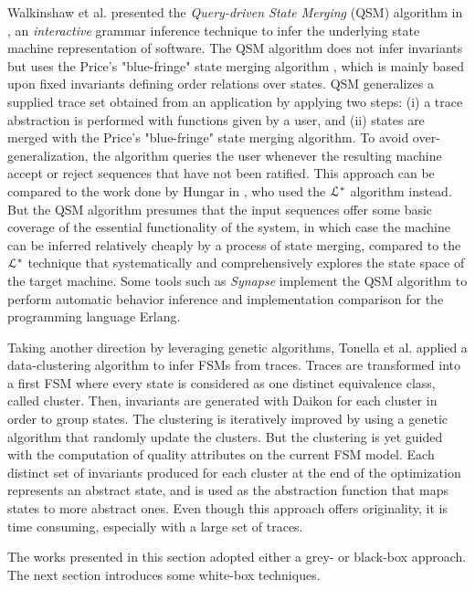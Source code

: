 Walkinshaw et al. presented the \textit{Query-driven State
Merging} (QSM) algorithm in
\cite{Walkinshaw07reverseengineering}, an \textit{interactive}
grammar inference technique to infer the underlying state machine
representation of software. The QSM algorithm does not infer
invariants but uses the Price's "blue-fringe" state merging
algorithm \cite{Lang:1998:RAO:645517.655780}, which is mainly
based upon fixed invariants defining order relations over states.
QSM generalizes a supplied trace set obtained from an application
by applying two steps: (i) a trace abstraction is performed
with functions given by a user, and (ii) states are merged with
the Price's "blue-fringe" state merging algorithm. To avoid
over-generalization, the algorithm queries the user whenever the
resulting machine accept or reject sequences that have not
been ratified. This approach can be compared to the work done by
Hungar in \cite{hungar}, who used the $\EuScript{L}^*$ algorithm
instead. But the QSM algorithm presumes that the input sequences
offer some basic coverage of the essential functionality of the
system, in which case the machine can be inferred relatively
cheaply by a process of state merging, compared to the
$\EuScript{L}^*$ technique that systematically and
comprehensively explores the state space of the target machine.
Some tools such as \textit{Synapse}
\cite{LamelaSeijas:2014:SAB:2633448.2633457} implement the QSM
algorithm to perform automatic behavior inference and
implementation comparison for the programming language Erlang.

Taking another direction by leveraging genetic algorithms,
Tonella et al. \cite{TonellaNMLH13} applied a data-clustering
algorithm to infer FSMs from traces. Traces are transformed into a
first FSM where every state is considered as one distinct
equivalence class, called cluster. Then, invariants are generated
with Daikon for each cluster in order to group states. The
clustering is iteratively improved by using a genetic algorithm
that randomly update the clusters. But the clustering is yet
guided with the computation of quality attributes on the current
FSM model. Each distinct set of invariants produced for each
cluster at the end of the optimization represents an abstract
state, and is used as the abstraction function that maps states
to more abstract ones. Even though this approach offers
originality, it is time consuming, especially with a large set of
traces.

The works presented in this section adopted either a grey- or
black-box approach. The next section introduces some white-box
techniques.

